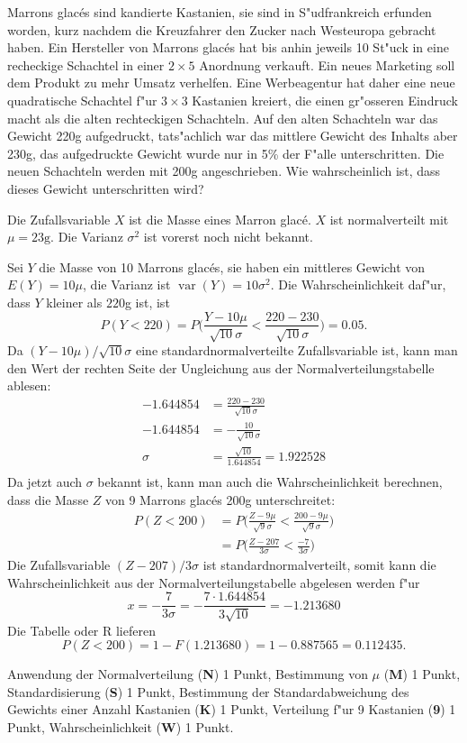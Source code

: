Marrons glac\'es sind kandierte Kastanien, sie sind in S"udfrankreich
erfunden worden, kurz nachdem die Kreuzfahrer den Zucker nach Westeuropa
gebracht haben. Ein Hersteller von Marrons glac\'es hat bis anhin
jeweils 10 St"uck in eine recheckige Schachtel in einer $2\times 5$
Anordnung verkauft. Ein neues Marketing soll dem Produkt zu mehr
Umsatz verhelfen. Eine Werbeagentur hat daher eine neue quadratische Schachtel 
f"ur $3\times 3$ Kastanien kreiert, die einen gr"osseren Eindruck
macht als die alten rechteckigen Schachteln. Auf den alten Schachteln
war das Gewicht 220g aufgedruckt, tats"achlich war das mittlere
Gewicht des Inhalts aber 230g, das aufgedruckte Gewicht wurde
nur in 5\% der F"alle unterschritten. Die neuen Schachteln werden mit
200g angeschrieben. Wie wahrscheinlich ist, dass dieses Gewicht unterschritten
wird?

\begin{loesung}
Die Zufallsvariable $X$ ist die Masse eines Marron glac\'e. $X$ ist
normalverteilt mit $\mu = 23\text{g}$. Die Varianz $\sigma^2$ ist vorerst
noch nicht bekannt.

Sei $Y$ die Masse von 10 Marrons glac\'es, sie haben ein mittleres Gewicht von
$E(Y)=10\mu$, die Varianz ist $\operatorname{var}(Y)=10\sigma^2$.
Die Wahrscheinlichkeit daf"ur, dass $Y$ kleiner als $220$g ist, ist
\[
P(Y<220)=P\biggl(\frac{Y-10\mu}{\sqrt{10}\sigma}<\frac{220-230}{\sqrt{10}\sigma}\biggr)=0.05.
\]
Da $(Y-10\mu)/\sqrt{10}\sigma$ eine standardnormalverteilte Zufallsvariable
ist, kann man den Wert der rechten Seite der Ungleichung aus der
Normalverteilungstabelle ablesen:
\begin{align*}
-1.644854&= \frac{220-230}{\sqrt{10}\sigma}\\
-1.644854&= -\frac{10}{\sqrt{10}\sigma}\\
\sigma &= \frac{\sqrt{10}}{1.644854}=1.922528\\
\end{align*}
Da jetzt auch $\sigma$ bekannt ist, kann man auch die Wahrscheinlichkeit
berechnen, dass die Masse $Z$ von 9 Marrons glac\'es 200g unterschreitet:
\begin{align*}
P(Z<200)
&=
P\biggl(\frac{Z-9\mu}{\sqrt{9}\sigma}<\frac{200-9\mu}{\sqrt{9}\sigma} \biggr)
\\
&=
P\biggl(\frac{Z-207}{3\sigma}<\frac{-7}{3\sigma} \biggr)
\end{align*}
Die Zufallsvariable $(Z-207)/3\sigma$ ist standardnormalverteilt, somit
kann die Wahrscheinlichkeit aus der Normalverteilungstabelle abgelesen
werden f"ur
\[
x=-\frac{7}{3\sigma}=-\frac{7\cdot1.644854}{3\sqrt{10}}=-1.213680
\]
Die Tabelle oder R lieferen
\[
P(Z<200)=1-F(1.213680)=1-0.887565=0.112435.
\]
\end{loesung}


\begin{bewertung}
Anwendung der Normalverteilung ({\bf N}) 1 Punkt,
Bestimmung von $\mu$ ({\bf M}) 1 Punkt,
Standardisierung ({\bf S}) 1 Punkt,
Bestimmung der Standardabweichung des Gewichts einer Anzahl Kastanien ({\bf K}) 1 Punkt,
Verteilung f"ur 9 Kastanien ({\bf 9}) 1 Punkt,
Wahrscheinlichkeit ({\bf W}) 1 Punkt.
\end{bewertung}



